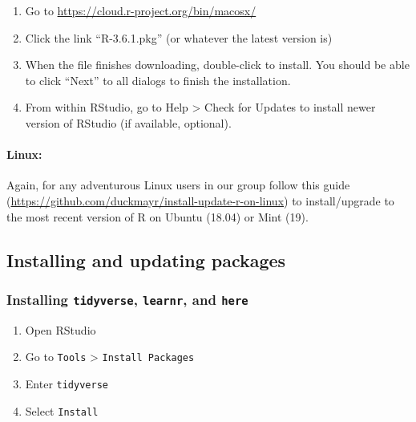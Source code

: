 \documentclass[
]{article}
\providecommand{\tightlist}{%
  \setlength{\itemsep}{0pt}\setlength{\parskip}{0pt}}
\begin{document}
\begin{enumerate}
\def\labelenumi{\arabic{enumi}.}
\tightlist
\item
  Go to \url{https://cloud.r-project.org/bin/macosx/}\\
\item
  Click the link ``R-3.6.1.pkg'' (or whatever the latest version is)
\item
  When the file finishes downloading, double-click to install. You
  should be able to click ``Next'' to all dialogs to finish the
  installation.\\
\item
  From within RStudio, go to Help \textgreater{} Check for Updates to
  install newer version of RStudio (if available, optional).
\end{enumerate}

\hypertarget{linux-1}{%
\paragraph{Linux:}\label{linux-1}}

Again, for any adventurous Linux users in our group follow this guide
(\url{https://github.com/duckmayr/install-update-r-on-linux}) to
install/upgrade to the most recent version of R on Ubuntu (18.04) or
Mint (19).

\hypertarget{installing-and-updating-packages}{%
\subsection{Installing and updating
packages}\label{installing-and-updating-packages}}

\hypertarget{installing-tidyverse-learnr-and-here}{%
\subsubsection{\texorpdfstring{Installing \texttt{tidyverse},
\texttt{learnr}, and
\texttt{here}}{Installing tidyverse, learnr, and here}}\label{installing-tidyverse-learnr-and-here}}

\begin{enumerate}
\def\labelenumi{\arabic{enumi}.}
\tightlist
\item
  Open RStudio
\item
  Go to \texttt{Tools} \textgreater{} \texttt{Install\ Packages}
\item
  Enter \texttt{tidyverse}
\item
  Select \texttt{Install}
\end{enumerate}
\end{document}
